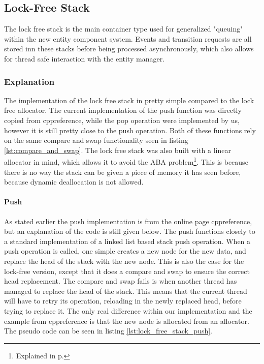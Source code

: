 \subsection{Lock-Free Stack}
\label{subsec:detailed_lock_free_stack}
The lock free stack is the main container type used for generalized "queuing" within
the new entity component system. Events and transition requests are all stored
inn these stacks before being processed asynchronously, which also
allows for thread safe interaction with the entity manager.

\subsubsection{Explanation}
The implementation of the lock free stack in pretty simple compared to the lock free allocator.
The current implementation of the push function was directly copied from cppreference\cite{cppreference_atomic_compare_exchange},
while the pop operation were implemented by us, however it is still pretty close to the push
operation.
Both of these functions rely on the same compare and swap functionality seen in listing \ref{lst:compare_and_swap}.
The lock free stack was also built with a linear allocator in mind, which allows it to avoid the ABA problem\footnote{Explained in p.\pageref{subpar:detailed_lock_free_allocator_aba}}.
This is because there is no way the stack can be given a piece of memory it has seen before, because dynamic deallocation is not allowed.

\paragraph{Push}
As stated earlier the push implementation is from the online page cppreference\cite{cppreference_atomic_compare_exchange},
but an explanation of the code is still given below.
The push functions closely to a standard implementation of a linked list based stack push operation.
When a push operation is called, one simple creates a new node for the new data,
and replace the head of the stack with the new node.
This is also the case for the lock-free version, except that it does a compare and swap
to ensure the correct head replacement.
The compare and swap fails is when another thread has managed to replace the head
of the stack. This means that the current thread will have to retry its operation,
reloading in the newly replaced head, before trying to replace it.
The only real difference within our implementation and the example from cppreference
is that the new node is allocated from an allocator.
The pseudo code can be seen in listing \ref{lst:lock_free_stack_push}.


